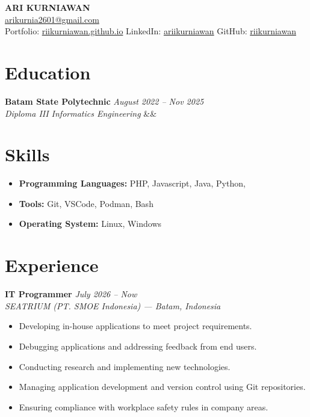 \documentclass[a4paper,11pt]{article}
\newcommand{\entry}[4]{
  \textbf{#1} \hfill \textit{#2} \\
  \textit{#3}
  \ifx&#4&\else
    \\ #4
  \fi
  \vspace{4pt}
}
\begin{document}
\begin{center}
  {\LARGE\bfseries ARI KURNIAWAN} \\[4pt]
  \href{mailto:arikurnia2601@gmail.com}{arikurnia2601@gmail.com} \\
  Portfolio: \href{https://riikurniawan.github.io}{riikurniawan.github.io} \quad
  LinkedIn: \href{https://linkedin.com/in/ariikurniawan}{ariikurniawan} \quad
  GitHub: \href{https://github.com/riikurniawan}{riikurniawan}
\end{center}

\vspace{6pt}

\section{Education}

\entry
  {Batam State Polytechnic}
  {August 2022 --  Nov 2025}
  {Diploma III Informatics Engineering}
  {}

\section{Skills}

\begin{itemize}[leftmargin=*, nosep]
  \item \textbf{Programming Languages:} PHP, Javascript, Java, Python,
  \item \textbf{Tools:} Git, VSCode, Podman, Bash
  \item \textbf{Operating System:} Linux, Windows
\end{itemize}

\section{Experience}

\textbf{IT Programmer} \hfill \textit{July 2026 -- Now} \\
\textit{SEATRIUM (PT. SMOE Indonesia) --- Batam, Indonesia}
\begin{itemize}[leftmargin=*, nosep, topsep=2pt]
  \item Developing in-house applications to meet project requirements.
  \item Debugging applications and addressing feedback from end users.
  \item Conducting research and implementing new technologies.
  \item Managing application development and version control using Git repositories.
  \item Ensuring compliance with workplace safety rules in company areas.
\end{itemize}
\end{document}
